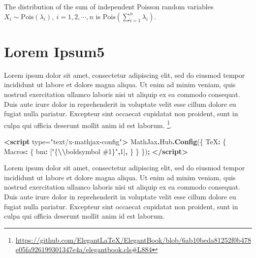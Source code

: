 \documentclass[
]{elegantbook}
\newenvironment{Shaded}{\begin{snugshade}}{\end{snugshade}}
\newcommand{\AttributeTok}[1]{\textcolor[rgb]{0.13,0.29,0.53}{#1}}
\newcommand{\DataTypeTok}[1]{\textcolor[rgb]{0.13,0.29,0.53}{#1}}
\newcommand{\DecValTok}[1]{\textcolor[rgb]{0.00,0.00,0.81}{#1}}
\newcommand{\FunctionTok}[1]{\textcolor[rgb]{0.13,0.29,0.53}{\textbf{#1}}}
\newcommand{\KeywordTok}[1]{\textcolor[rgb]{0.13,0.29,0.53}{\textbf{#1}}}
\newcommand{\NormalTok}[1]{#1}
\newcommand{\OperatorTok}[1]{\textcolor[rgb]{0.81,0.36,0.00}{\textbf{#1}}}
\newcommand{\OtherTok}[1]{\textcolor[rgb]{0.56,0.35,0.01}{#1}}
\newcommand{\SpecialCharTok}[1]{\textcolor[rgb]{0.81,0.36,0.00}{\textbf{#1}}}
\newcommand{\StringTok}[1]{\textcolor[rgb]{0.31,0.60,0.02}{#1}}
\begin{document}
\begin{proposition}
\protect\hypertarget{prp:unnamed-chunk-4}{}\label{prp:unnamed-chunk-4}The distribution of the sum of independent Poisson random variables \(X_i \sim \mathrm{Pois}(\lambda_i),\: i=1,2,\cdots,n\) is \(\mathrm{Pois}(\sum_{i=1}^n\lambda_i)\).
\end{proposition}

\hypertarget{math-formular}{%
\section{Lorem Ipsum5}\label{math-formular}}

Lorem ipsum dolor sit amet, consectetur adipiscing elit, sed do eiusmod tempor incididunt ut labore et dolore magna aliqua. Ut enim ad minim veniam, quis nostrud exercitation ullamco laboris nisi ut aliquip ex ea commodo consequat. Duis aute irure dolor in reprehenderit in voluptate velit esse cillum dolore eu fugiat nulla pariatur. Excepteur sint occaecat cupidatat non proident, sunt in culpa qui officia deserunt mollit anim id est laborum. \footnote{\url{https://github.com/ElegantLaTeX/ElegantBook/blob/6ab10beda81252f0b478e05fa926199301347e4a/elegantbook.cls\#L884}}.

\begin{Shaded}
\begin{Highlighting}[]
\KeywordTok{\textless{}script}\OtherTok{ type=}\StringTok{"text/x{-}mathjax{-}config"}\KeywordTok{\textgreater{}}
\NormalTok{    MathJax}\OperatorTok{.}\AttributeTok{Hub}\OperatorTok{.}\FunctionTok{Config}\NormalTok{(\{}
      \DataTypeTok{TeX}\OperatorTok{:}\NormalTok{ \{}
        \DataTypeTok{Macros}\OperatorTok{:}\NormalTok{ \{}
          \DataTypeTok{bm}\OperatorTok{:}\NormalTok{ [}\StringTok{"\{}\SpecialCharTok{\textbackslash{}\textbackslash{}}\StringTok{boldsymbol \#1\}"}\OperatorTok{,}\DecValTok{1}\NormalTok{]}\OperatorTok{,}
\NormalTok{        \}}
\NormalTok{      \}}
\NormalTok{    \})}\OperatorTok{;}
\KeywordTok{\textless{}/script\textgreater{}}
\end{Highlighting}
\end{Shaded}

Lorem ipsum dolor sit amet, consectetur adipiscing elit, sed do eiusmod tempor incididunt ut labore et dolore magna aliqua. Ut enim ad minim veniam, quis nostrud exercitation ullamco laboris nisi ut aliquip ex ea commodo consequat. Duis aute irure dolor in reprehenderit in voluptate velit esse cillum dolore eu fugiat nulla pariatur. Excepteur sint occaecat cupidatat non proident, sunt in culpa qui officia deserunt mollit anim id est laborum.
\end{document}
